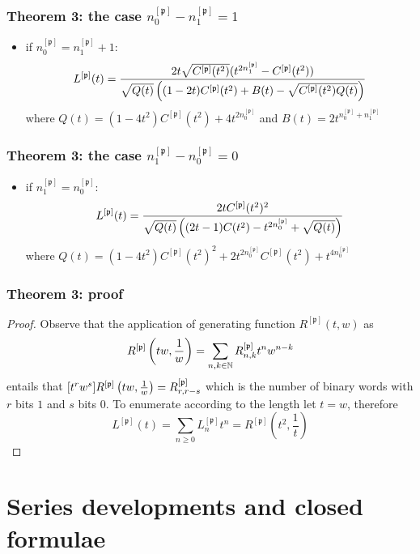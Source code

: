 \documentclass{beamer}
\begin{document}
\begin{frame}\frametitle{Theorem 3: the case $n_0^{[\mathfrak{p}]}-n_1^{[\mathfrak{p}]}=1$}
\begin{itemize}
\item if $n_0^{[\mathfrak{p}]}=n_1^{[\mathfrak{p}]}+1:$
$$L^{[\mathfrak{p}]}(t)={2t\sqrt{C^{[\mathfrak{p}]}(t^2)}(t^{2n_1^{[\mathfrak{p}]}}-C^{[\mathfrak{p}]}(t^2))
\over \sqrt{ Q(t) }\left((1-2t)C^{[\mathfrak{p}]}(t^2)+ B(t) - \sqrt{C^{[\mathfrak{p}]}(t^2) Q(t) } \right)}$$
where $Q(t)=(1-4t^2)C^{[\mathfrak{p}]}(t^2)+4t^{2n_0^{[\mathfrak{p}]}}$ and
$B(t)=2t^{n_0^{[\mathfrak{p}]} +n_1^{[\mathfrak{p}]}}$
\end{itemize}
\end{frame}

\begin{frame}\frametitle{Theorem 3: the case $n_1^{[\mathfrak{p}]}-n_0^{[\mathfrak{p}]}=0$}
\begin{itemize}
\item if $n_1^{[\mathfrak{p}]}=n_0^{[\mathfrak{p}]}:$ $$L^{[\mathfrak{p}]}(t)=
{2tC^{[\mathfrak{p}]}(t^2)^2 \over \sqrt{ Q(t)
}\left((2t-1)C(t^2)-t^{2n_0^{[\mathfrak{p}]}} + \sqrt{ Q(t) } \right)}$$
where
$Q(t)=(1-4t^2)C^{[\mathfrak{p}]}(t^2)^2+2t^{2n_0^{[\mathfrak{p}]}}C^{[\mathfrak{p}]}(t^2)+t^{4n_0^{[\mathfrak{p}]}}$
\end{itemize}
\end{frame}

\begin{frame}\frametitle{Theorem 3: proof}
\begin{proof}
Observe that the application of generating function $R^{[\mathfrak{p}]}(t, w)$ as
\begin{displaymath}
 R^{[\mathfrak{p}]}\left(tw,{1 \over w}\right)=\sum_{n,k\in\mathbb{N}} R_{n, k}^{[\mathfrak{p}]}t^n w^{n-k}
\end{displaymath}
entails that $[t^{r}w^{s}]R^{[\mathfrak{p}]}\left(tw,{1 \over w}\right)=R_{r,
r-s}^{[\mathfrak{p}]}$ which is the number of binary words with $r$ bits $1$
and $s$ bits $0$. To enumerate according to the length let $t=w$, therefore
$$L^{[\mathfrak{p}]}(t)=\sum_{n\geq 0}L_n^{[\mathfrak{p}]}t^n=R^{[\mathfrak{p}]}\left(t^2,\frac{1}{t}\right)$$
\end{proof}
\end{frame}


\section{Series developments and closed formulae}
\end{document}
